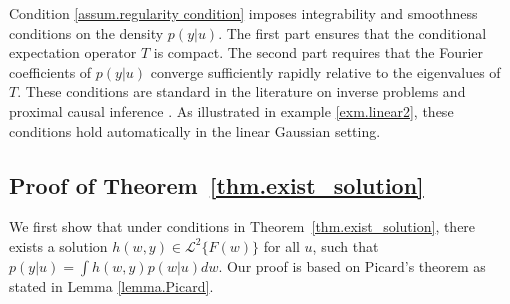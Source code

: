 \documentclass[
  12pt]{article}
\def\cL{\mathcal{L}}
\begin{document}
Condition \ref{assum.regularity condition} imposes integrability and smoothness conditions on the density $p(y|u)$. The first part ensures that the conditional expectation operator $T$ is compact. The second part requires that the Fourier coefficients of $p(y|u)$ converge sufficiently rapidly relative to the eigenvalues of $T$. These conditions are standard in the literature on inverse problems and proximal causal inference \citep{carrasco2007linear,miao2018identifying,liu2023causal}. As illustrated in example \ref{exm.linear2}, these conditions hold automatically in the linear Gaussian setting.


\subsection{Proof of Theorem~\ref{thm.exist_solution}}
We first show that under conditions in  Theorem~\ref{thm.exist_solution}, there exists a solution $h(w,y) \in \cL^2\{F(w)\}$ for all $u$, such that $p(y|u) =\int{h(w,y) p(w|u) dw}$. Our proof is based on Picard's theorem as stated in Lemma \ref{lemma.Picard}.
\end{document}
